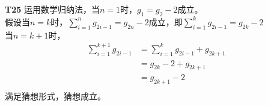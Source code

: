 \documentclass{article}
\begin{document}
\vspace{10pt}

\textbf{T25}
运用数学归纳法，当$n = 1$时，$g_1 = g_2 - 2$成立。\\
假设当$n = k$时，$\sum_{i = 1}^{n}g_{2i - 1} = g_{2n} - 2$成立，即$\sum_{i = 1}^{k}g_{2i - 1} = g_{2k} - 2$\\
当$n = k + 1$时，
\begin{align*}
    \sum_{i = 1}^{k + 1}g_{2i - 1} &= \sum_{i = 1}^{k}g_{2i - 1} + g_{2k + 1}\\
    &= g_{2k} - 2 + g_{2k + 1}\\
    &= g_{2k + 1} - 2\\
\end{align*}
满足猜想形式，猜想成立。
\end{document}
